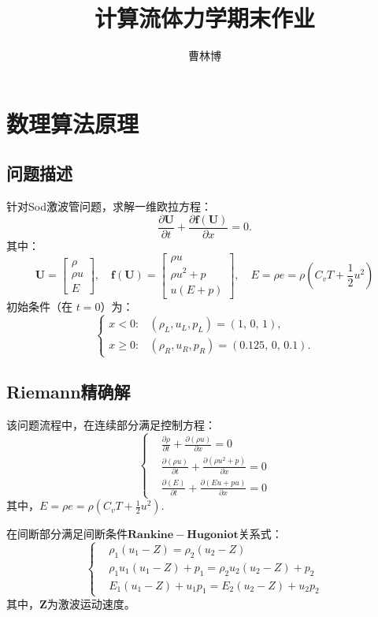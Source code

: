 \documentclass[12pt,a4paper]{article}%
\title{\fontsize{18pt}{27pt}\selectfont%
	{\heiti%
		计算流体力学期末作业}}%
\author{\fontsize{12pt}{18pt}\selectfont%
	{\fangsong%
		曹林博 \quad 2200011012}} %
\date{}%
\begin{document}
	\maketitle
	
	\section{数理算法原理}
		\subsection{问题描述}
		 针对Sod激波管问题，求解一维欧拉方程：
		 \[
		 	\frac{\partial \mathbf{U}}{\partial t} + \frac{\partial \mathbf{f}(\mathbf{U})}{\partial x} = 0.
		 \]
		 其中：
		 \[
		 \mathbf{U} = 
		 \begin{bmatrix}
		 	\rho \\
		 	\rho u \\
		 	E
		 \end{bmatrix}, \quad
		 \mathbf{f}(\mathbf{U}) = 
		 \begin{bmatrix}
		 	\rho u \\
		 	\rho u^2 + p \\
		 	u(E + p)
		 \end{bmatrix}, \quad
		 E = \rho e = \rho \left( C_v T + \frac{1}{2} u^2 \right)
		 \]
		 初始条件（在 $t=0$）为：
		 \[
		 \begin{cases}
		 	x < 0: & (\rho_L, u_L, p_L) = (1,\, 0,\, 1), \\
		 	x \ge 0: & (\rho_R, u_R, p_R) = (0.125,\, 0,\, 0.1).
		 \end{cases}
		 \]
		 
		 \subsection{Riemann精确解}
		 该问题流程中，在连续部分满足控制方程：
		 \[
		 \left\{
		 \begin{aligned}
		 	&\frac{\partial \rho}{\partial t} + \frac{\partial (\rho u)}{\partial x} = 0 \\
		 	&\frac{\partial (\rho u)}{\partial t} + \frac{\partial (\rho u^2 + p)}{\partial x} = 0 \\
		 	&\frac{\partial (E)}{\partial t} + \frac{\partial (E u + p u)}{\partial x} = 0
		 \end{aligned}
		 \right.
		 \]
		 其中，$E = \rho e = \rho (C_v T + \frac{1}{2} u^2)$.
		 
		 在间断部分满足间断条件$\mathbf{Rankine-Hugoniot}$关系式：
		 \[
		 \left\{
		 \begin{aligned}
		 	& \rho_1(u_1 - Z) = \rho_2(u_2 - Z) \\
		 	& \rho_1 u_1(u_1 - Z) + p_1 = \rho_2 u_2(u_2 - Z) + p_2 \\
		 	& E_1(u_1 - Z) + u_1 p_1 = E_2(u_2 - Z) + u_2 p_2
		 \end{aligned}
		 \right.
		 \]
		 其中，$\mathbf{Z}$为激波运动速度。
		 
\end{document}
